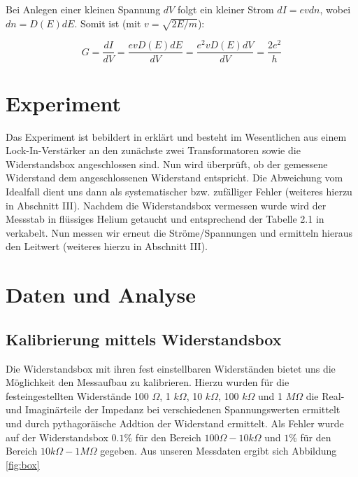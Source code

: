 \documentclass[aps,twocolumn,secnumarabic,nobalancelastpage,amsmath,amssymb,
nofootinbib,superscriptaddress]{revtex4-1}
\begin{document}
Bei Anlegen einer kleinen Spannung $dV$ folgt ein kleiner Strom $dI = e v dn$,
wobei $dn = D(E)dE$. Somit ist (mit $v = \sqrt{2E/m}$):

  \begin{equation}
    G = \frac{dI}{dV} = \frac{evD(E)dE}{dV} = \frac{e^2vD(E)dV}{dV} = \frac{2e^2}{h}
  \end{equation}






\section{Experiment}

Das Experiment ist bebildert in \cite{skript11} erklärt und besteht im Wesentlichen
aus einem Lock-In-Verstärker an den zunächste zwei Transformatoren sowie die
Widerstandsbox angeschlossen sind. Nun wird überprüft, ob der gemessene Widerstand
dem angeschlossenen Widerstand entspricht. Die Abweichung vom Idealfall dient uns
dann als systematischer bzw. zufälliger Fehler (weiteres hierzu in Abschnitt III).
Nachdem die Widerstandsbox vermessen wurde wird der Messstab in flüssiges Helium
getaucht und entsprechend der Tabelle 2.1 in \cite{skript11} verkabelt. Nun messen
wir erneut die Ströme/Spannungen und ermitteln hieraus den Leitwert (weiteres
hierzu in Abschnitt III).



\section{Daten und Analyse}
\subsection{Kalibrierung mittels Widerstandsbox}
Die Widerstandsbox mit ihren fest einstellbaren Widerständen bietet uns die
Möglichkeit den Messaufbau zu kalibrieren. Hierzu wurden für die festeingestellten
Widerstände 100 $\Omega$, 1 $k\Omega$, 10 $k\Omega$, 100 $k\Omega$ und 1 $M\Omega$
die Real- und Imaginärteile der Impedanz bei verschiedenen Spannungswerten ermittelt
und durch pythagoräische Addtion der Widerstand ermittelt. Als Fehler wurde auf der
Widerstandsbox $0.1\%$ für den Bereich $100\Omega - 10k\Omega$ und $1\%$ für den
Bereich $10k\Omega - 1M\Omega$ gegeben. Aus unseren Messdaten ergibt sich Abbildung
\ref{fig:box}
\end{document}
